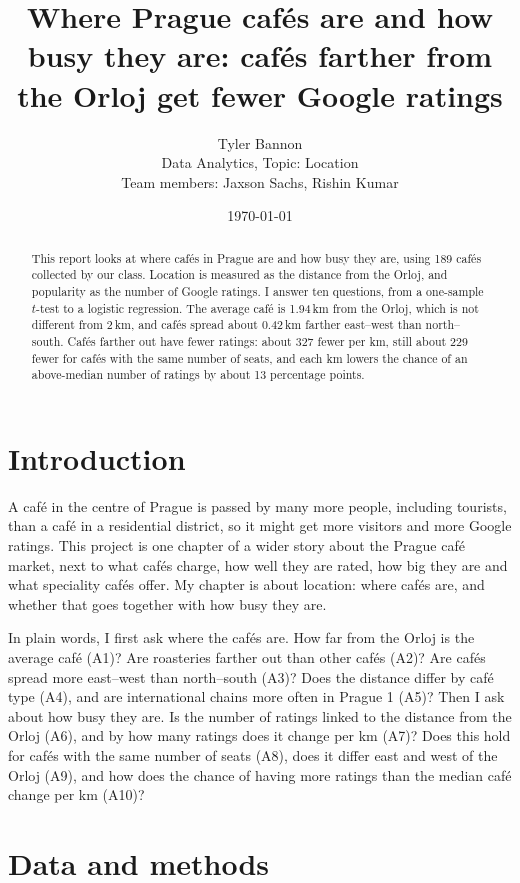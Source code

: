 \documentclass[11pt,a4paper]{article}
\title{\textbf{Where Prague caf\'es are and how busy they are: caf\'es farther from the Orloj get fewer Google ratings}}
\author{Tyler Bannon\\[0.3ex]\small Data Analytics, Topic: Location\\[0.3ex]\small Team members: Jaxson Sachs, Rishin Kumar}
\date{\today}
\begin{document}
\maketitle

\begin{abstract}
\noindent This report looks at where caf\'es in Prague are and how busy they are, using 189 caf\'es collected by our class. Location is measured as the distance from the Orloj, and popularity as the number of Google ratings. I answer ten questions, from a one-sample $t$-test to a logistic regression. The average caf\'e is 1.94\,km from the Orloj, which is not different from 2\,km, and caf\'es spread about 0.42\,km farther east--west than north--south. Caf\'es farther out have fewer ratings: about 327 fewer per km, still about 229 fewer for caf\'es with the same number of seats, and each km lowers the chance of an above-median number of ratings by about 13 percentage points.
\end{abstract}

\section{Introduction}
A caf\'e in the centre of Prague is passed by many more people, including tourists, than a caf\'e in a residential district, so it might get more visitors and more Google ratings. This project is one chapter of a wider story about the Prague caf\'e market, next to what caf\'es charge, how well they are rated, how big they are and what speciality caf\'es offer. My chapter is about location: where caf\'es are, and whether that goes together with how busy they are.

In plain words, I first ask where the caf\'es are. How far from the Orloj is the average caf\'e (A1)? Are roasteries farther out than other caf\'es (A2)? Are caf\'es spread more east--west than north--south (A3)? Does the distance differ by caf\'e type (A4), and are international chains more often in Prague 1 (A5)? Then I ask about how busy they are. Is the number of ratings linked to the distance from the Orloj (A6), and by how many ratings does it change per km (A7)? Does this hold for caf\'es with the same number of seats (A8), does it differ east and west of the Orloj (A9), and how does the chance of having more ratings than the median caf\'e change per km (A10)?

\section{Data and methods}
\end{document}
